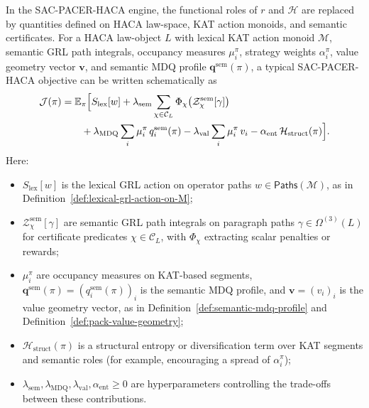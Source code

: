\documentclass[11pt]{book}
\theoremstyle{plain}
\theoremstyle{definition}
\theoremstyle{remark}
\begin{document}
In the SAC-PACER-HACA engine, the functional roles of $r$ and
$\mathcal{H}$ are replaced by quantities defined on HACA law-space,
KAT action monoids, and semantic certificates. For a HACA law-object
$L$ with lexical KAT action monoid $\mathcal{M}$, semantic GRL path
integrals, occupancy measures $\mu_i^\pi$, strategy weights
$\alpha_i^\pi$, value geometry vector $\mathbf{v}$, and semantic MDQ
profile $\mathbf{q}^{\mathrm{sem}}(\pi)$, a typical SAC-PACER-HACA
objective can be written schematically as
\[
\begin{aligned}
  \mathcal{J}(\pi)
  &=
  \mathbb{E}_\pi
  \Bigl[
    S_{\mathrm{lex}}[w]
    + \lambda_{\mathrm{sem}}
      \sum_{\chi\in\mathcal{C}_L}
      \Phi_\chi\bigl(\mathcal{Z}^{\mathrm{sem}}_\chi[\gamma]\bigr)\\
  &\qquad
    + \lambda_{\mathrm{MDQ}}
      \sum_{i}\mu_i^\pi\,q_i^{\mathrm{sem}}(\pi)
    - \lambda_{\mathrm{val}}
      \sum_{i}\mu_i^\pi\,v_i
    - \alpha_{\mathrm{ent}}\,
      \mathcal{H}_{\mathrm{struct}}(\pi)
  \Bigr].
\end{aligned}
\]
Here:
\begin{itemize}
  \item $S_{\mathrm{lex}}[w]$ is the lexical GRL action on operator
        paths $w\in\mathsf{Paths}(\mathcal{M})$, as in
        Definition~\ref{def:lexical-grl-action-on-M};
  \item $\mathcal{Z}^{\mathrm{sem}}_\chi[\gamma]$ are semantic GRL
        path integrals on paragraph paths
        $\gamma\in\Omega^{(3)}(L)$ for certificate predicates
        $\chi\in\mathcal{C}_L$, with $\Phi_\chi$ extracting scalar
        penalties or rewards;
  \item $\mu_i^\pi$ are occupancy measures on KAT-based segments,
        $\mathbf{q}^{\mathrm{sem}}(\pi)=(q_i^{\mathrm{sem}}(\pi))_i$
        is the semantic MDQ profile, and
        $\mathbf{v}=(v_i)_i$ is the value geometry vector, as in
        Definition~\ref{def:semantic-mdq-profile} and
        Definition~\ref{def:pack-value-geometry};
  \item $\mathcal{H}_{\mathrm{struct}}(\pi)$ is a structural entropy
        or diversification term over KAT segments and semantic roles
        (for example, encouraging a spread of $\alpha_i^\pi$);
  \item $\lambda_{\mathrm{sem}},\lambda_{\mathrm{MDQ}},\lambda_{\mathrm{val}},
        \alpha_{\mathrm{ent}}\ge 0$ are hyperparameters controlling
        the trade-offs between these contributions.
\end{itemize}
\end{document}
